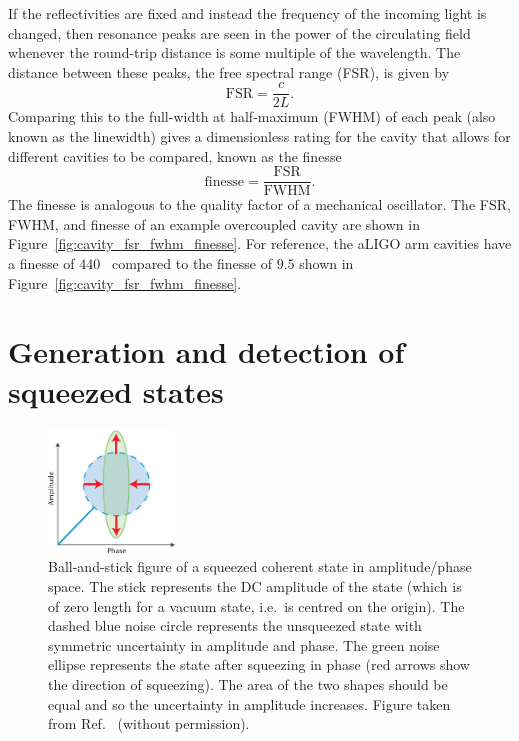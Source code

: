 \documentclass[aps,pra,superscriptaddress,reprint,nofootinbib]{revtex4-1}
\begin{document}
If the reflectivities are fixed and instead the frequency of the incoming light is changed, then resonance peaks are seen in the power of the circulating field whenever the round-trip distance is some multiple of the wavelength. The distance between these peaks, the free spectral range (FSR), is given by
\begin{equation}
\mathrm{FSR} = \frac{c}{2L}.
\end{equation}
Comparing this to the full-width at half-maximum (FWHM) of each peak (also known as the linewidth) gives a dimensionless rating for the cavity that allows for different cavities to be compared, known as the finesse
\begin{equation}
\mathrm{finesse} = \frac{\mathrm{FSR}}{\mathrm{FWHM}}.
\end{equation}
The finesse is analogous to the quality factor of a mechanical oscillator.
The FSR, FWHM, and finesse of an example overcoupled cavity are shown in Figure~\ref{fig:cavity_fsr_fwhm_finesse}.
For reference, the aLIGO arm cavities have a finesse of $440$~\cite{AdvancedLIGO:2015} compared to the finesse of $9.5$ shown in Figure~\ref{fig:cavity_fsr_fwhm_finesse}.


\section{Generation and detection of squeezed states}
\label{sec:squeezing}

\begin{figure}[ht]%
	\begin{center}
	\includegraphics[width=0.3\textwidth]{figures/ball_and_stick_squeezed_state.png}
	\end{center}
	\caption{Ball-and-stick figure of a squeezed coherent state in amplitude/phase space. The stick represents the DC amplitude of the state (which is of zero length for a vacuum state, i.e.\ is centred on the origin). The dashed blue noise circle represents the unsqueezed state with symmetric uncertainty in amplitude and phase. The green noise ellipse represents the state after squeezing in phase (red arrows show the direction of squeezing). The area of the two shapes should be equal and so the uncertainty in amplitude increases. Figure taken from Ref.~\cite{Sparkes2013StorageAM} (without permission).}
	\label{fig:ball_and_stick_squeezed_state}
\end{figure}
\end{document}
